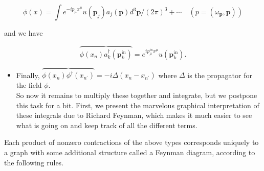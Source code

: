 \documentclass[10pt, letterpaper]{article}
\begin{document}
$$
\phi(x)=\int e^{-i p_{\mu} x^{\mu}} u\left(\mathbf{p}_{j}\right) a_{j}(\mathbf{p}) d^{3} \mathbf{p} /(2 \pi)^{3}+\cdots \quad\left(p=\left(\omega_{\mathbf{p}}, \mathbf{p}\right)\right)
$$

and we have

$$
\overbrace{\phi\left(x_{n}\right) a_{k}^{\dagger}\left(\mathbf{p}_{k}^{\mathrm{in}}\right)}=e^{i p_{\mu}^{\mathrm{in}} x^{\mu}} u\left(\mathbf{p}_{k}^{\mathrm{in}}\right) .
$$

\begin{itemize}
  \item Finally, $\overbrace{\phi\left(x_{n}\right) \phi^{\dagger}\left(x_{n^{\prime}}\right)}=-i \Delta\left(x_{n}-x_{n^{\prime}}\right)$ where $\Delta$ is the propagator for the field $\phi$.\\
So now it remains to multiply these together and integrate, but we postpone this task for a bit. First, we present the marvelous graphical interpretation of these integrals due to Richard Feynman, which makes it much easier to see what is going on and keep track of all the different terms.
\end{itemize}

Each product of nonzero contractions of the above types corresponds uniquely to a graph with some additional structure called a Feynman diagram, according to the following rules.
\end{document}
